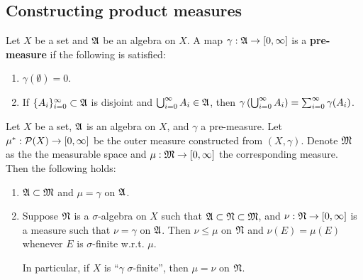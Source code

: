 \documentclass[a4paper]{article}
\begin{document}
\subsection{Constructing product measures}

\begin{defi}
Let $X$ be a set and $\mathfrak{A}$ be an algebra on $X$. A map
$\gamma: \mathfrak{A} \to [0, \infty]$ is a \textbf{pre-measure}
if the following is satisfied:
\begin{enumerate}
  \item $\gamma(\emptyset) = 0$.
  \item If $\{ A_i \}_{i=0}^\infty \subset \mathfrak{A}$ is disjoint and
  $\bigcup_{i=0}^\infty A_i \in \mathfrak{A}$, then $\gamma \left( \bigcup_{i=0}^\infty A_i \right)
  = \sum_{i=0}^\infty \gamma(A_i)$.
\end{enumerate}

\end{defi}

\begin{thm}
Let $X$ be a set, $\mathfrak{A}$ is an algebra on $X$, and
$\gamma$ a pre-measure. Let $\mu^* : \mathcal{P} (X) \to [0, \infty]$
be the outer measure constructed from $(X, \gamma)$.
Denote $\mathfrak{M}$ as the the measurable space and
$\mu: \mathfrak{M} \to [0, \infty]$ the corresponding measure.
Then the following holds:
\begin{enumerate}
  \item $\mathfrak{A} \subset \mathfrak{M}$ and $\mu = \gamma$ on $\mathfrak{A}$.

  \item Suppose $\mathfrak{N}$ is a $\sigma$-algebra on $X$
  such that $\mathfrak{A} \subset \mathfrak{N} \subset \mathfrak{M}$, and
  $\nu: \mathfrak{N} \to [0, \infty]$ is a measure such that
  $\nu = \gamma$ on $\mathfrak{A}$. Then $\nu \leq \mu$ on $\mathfrak{N}$
  and $\nu(E) = \mu(E)$ whenever $E$ is $\sigma$-finite
  w.r.t. $\mu$.

  In particular, if $X$ is ``$\gamma$ $\sigma$-finite'',
  then $\mu = \nu$ on $\mathfrak{N}$.
\end{enumerate}
\end{thm}
\end{document}
